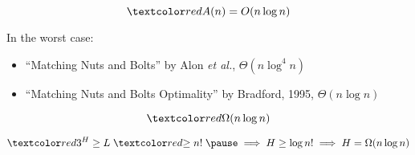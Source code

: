 % 
% 
% 

\begin{frame}{}
  \centerline{}

  \pause
  \centerline{}

  \pause
  \[
    \red{A(n)} = O(n \log n)
  \]

  \pause
  \begin{alertblock}{In the worst case:}
    \begin{itemize}
      \item ``Matching Nuts and Bolts'' by Alon \emph{et al.}, $\Theta(n \log^4 n)$
      \item ``Matching Nuts and Bolts Optimality'' by Bradford, 1995, $\Theta(n \log n)$ 
    \end{itemize}
  \end{alertblock}
\end{frame}

\begin{frame}{}

  \[
    \red{\Omega(n \log n)}
  \]

  \pause
  \[
    \red{3^{H}} \ge L \;\red{\ge n!}\; \pause \implies H \ge \log n! \implies H = \Omega(n \log n)
  \]
\end{frame}

